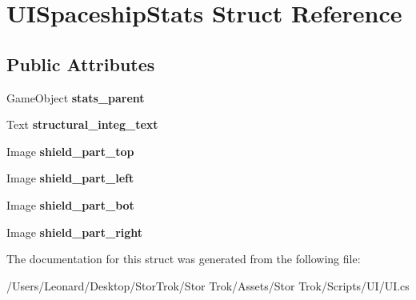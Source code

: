 \hypertarget{struct_u_i_spaceship_stats}{}\section{U\+I\+Spaceship\+Stats Struct Reference}
\label{struct_u_i_spaceship_stats}
\subsection*{Public Attributes}
\begin{DoxyCompactItemize}
\item 
\mbox{\label{struct_u_i_spaceship_stats_a4c2b95079637280514d483a4f733fd6d}} 
Game\+Object {\bfseries stats\+\_\+parent}
\item 
\mbox{\label{struct_u_i_spaceship_stats_abe090b46d83fa381c974c0db9ff6d644}} 
Text {\bfseries structural\+\_\+integ\+\_\+text}
\item 
\mbox{\label{struct_u_i_spaceship_stats_a78f25e3d1b58fa6f243e80f54919ebdc}} 
Image {\bfseries shield\+\_\+part\+\_\+top}
\item 
\mbox{\label{struct_u_i_spaceship_stats_ac6a6999b036253706642c08e86f4229c}} 
Image {\bfseries shield\+\_\+part\+\_\+left}
\item 
\mbox{\label{struct_u_i_spaceship_stats_a37939e0bcca1e3c5fdc11617564eaf5b}} 
Image {\bfseries shield\+\_\+part\+\_\+bot}
\item 
\mbox{\label{struct_u_i_spaceship_stats_add42106c6c55ad70209a7165398ed288}} 
Image {\bfseries shield\+\_\+part\+\_\+right}
\end{DoxyCompactItemize}


The documentation for this struct was generated from the following file\+:\begin{DoxyCompactItemize}
\item 
/\+Users/\+Leonard/\+Desktop/\+Stor\+Trok/\+Stor Trok/\+Assets/\+Stor Trok/\+Scripts/\+U\+I/U\+I.\+cs\end{DoxyCompactItemize}
